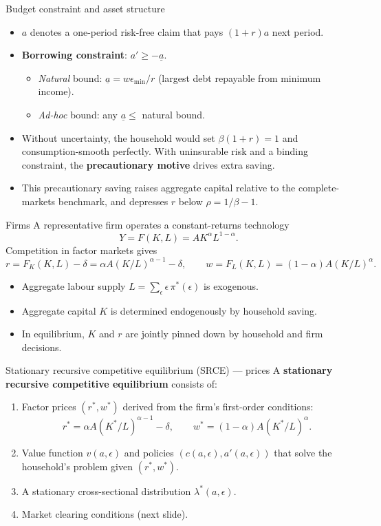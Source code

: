 \documentclass[10pt,english,aspectratio=169]{beamer}
\begin{document}
\begin{frame}{Budget constraint and asset structure}
\begin{itemize}
\item $a$ denotes a one-period risk-free claim that pays $(1+r)a$ next period.
\medskip
\item \textbf{Borrowing constraint}: $a' \geq -\underline{a}$.
  \begin{itemize}
  \item \emph{Natural} bound: $\underline{a} = w\epsilon_{\min}/r$ (largest debt repayable from minimum income).
  \item \emph{Ad-hoc} bound: any $\underline{a} \leq$ natural bound.
  \end{itemize}
\medskip
\item Without uncertainty, the household would set $\beta(1+r)=1$ and consumption-smooth perfectly. With uninsurable risk and a binding constraint, the \textbf{precautionary motive} drives extra saving.
\medskip
\item This precautionary saving raises aggregate capital relative to the complete-markets benchmark, and depresses $r$ below $\rho = 1/\beta - 1$.
\end{itemize}
\end{frame}

\begin{frame}{Firms}
A representative firm operates a constant-returns technology
\[
Y = F(K,L) = A K^{\alpha} L^{1-\alpha}.
\]
Competition in factor markets gives
\[
r = F_K(K,L) - \delta = \alpha A (K/L)^{\alpha-1} - \delta, \qquad
w = F_L(K,L) = (1-\alpha) A (K/L)^{\alpha}.
\]
\medskip
\begin{itemize}
\item Aggregate labour supply $L = \sum_\epsilon \epsilon\,\pi^*(\epsilon)$ is exogenous.
\item Aggregate capital $K$ is determined endogenously by household saving.
\item In equilibrium, $K$ and $r$ are jointly pinned down by household and firm decisions.
\end{itemize}
\end{frame}

\begin{frame}{Stationary recursive competitive equilibrium (SRCE) --- prices}
A \textbf{stationary recursive competitive equilibrium} consists of:
\begin{enumerate}
\item Factor prices $(r^*, w^*)$ derived from the firm's first-order conditions:
\[
r^* = \alpha A (K^*/L)^{\alpha-1} - \delta, \qquad w^* = (1-\alpha) A (K^*/L)^{\alpha}.
\]
\medskip
\item Value function $v(a,\epsilon)$ and policies $(c(a,\epsilon), a'(a,\epsilon))$ that solve the household's problem given $(r^*,w^*)$.
\medskip
\item A stationary cross-sectional distribution $\lambda^*(a,\epsilon)$.
\medskip
\item Market clearing conditions (next slide).
\end{enumerate}
\end{frame}
\end{document}
